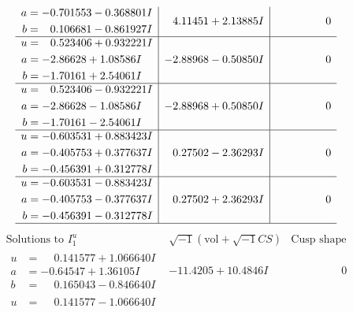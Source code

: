\documentclass[1p]{elsarticle_modified}
\theoremstyle{definition}
\newcommand{\I}{\sqrt{-1}}
\begin{document}
$$\begin{array}{c|c|c}
\begin{aligned}
a &= -0.701553 - 0.368801 I \\
b &= \phantom{-}0.106681 - 0.861927 I\end{aligned}
 & \phantom{-}4.11451 + 2.13885 I & \phantom{-0.000000 } 0 \\ \hline\begin{aligned}
u &= \phantom{-}0.523406 + 0.932221 I \\
a &= -2.86628 + 1.08586 I \\
b &= -1.70161 + 2.54061 I\end{aligned}
 & -2.88968 - 0.50850 I & \phantom{-0.000000 } 0 \\ \hline\begin{aligned}
u &= \phantom{-}0.523406 - 0.932221 I \\
a &= -2.86628 - 1.08586 I \\
b &= -1.70161 - 2.54061 I\end{aligned}
 & -2.88968 + 0.50850 I & \phantom{-0.000000 } 0 \\ \hline\begin{aligned}
u &= -0.603531 + 0.883423 I \\
a &= -0.405753 + 0.377637 I \\
b &= -0.456391 + 0.312778 I\end{aligned}
 & \phantom{-}0.27502 - 2.36293 I & \phantom{-0.000000 } 0 \\ \hline\begin{aligned}
u &= -0.603531 - 0.883423 I \\
a &= -0.405753 - 0.377637 I \\
b &= -0.456391 - 0.312778 I\end{aligned}
 & \phantom{-}0.27502 + 2.36293 I & \phantom{-0.000000 } 0\\
 \hline 
 \end{array}$$\newpage$$\begin{array}{c|c|c}  
\text{Solutions to }I^u_{1}& \I (\text{vol} + \sqrt{-1}CS) & \text{Cusp shape}\\
 \hline 
\begin{aligned}
u &= \phantom{-}0.141577 + 1.066640 I \\
a &= -0.64547 + 1.36105 I \\
b &= \phantom{-}0.165043 - 0.846640 I\end{aligned}
 & -11.4205 + 10.4846 I & \phantom{-0.000000 } 0 \\ \hline\begin{aligned}
u &= \phantom{-}0.141577 - 1.066640 I \\

\end{aligned}
\end{array}$$
\end{document}
